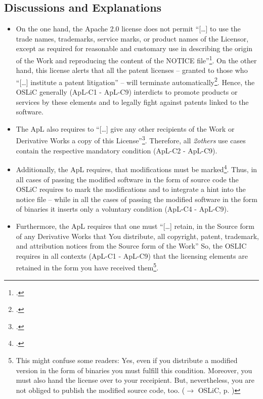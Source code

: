 \subsection{Discussions and Explanations}
\begin{itemize}
  \item On the one hand, the Apache 2.0 license does not permit
  \enquote{[\ldots] to use the trade names, trademarks, service marks, or
  product names of the Licensor, except as required for reasonable and customary
  use in describing the origin of the Work and reproducing the content of the
  NOTICE file}\footcite[cf.][\nopage wp.\ §6]{Apl20OsiLicense2004a}. On the other
  hand, this license alerts that all the patent licenses – granted to those who
  \enquote{[\ldots] institute a patent litigation} – will terminate
  automatically\footcite[cf.][\nopage wp.\ §3]{Apl20OsiLicense2004a}. Hence, the
  OSLiC generally (ApL-C1 - ApL-C9) interdicts to promote products or services by
  these elements and to legally fight against patents linked to the software.
  
  \item The ApL also requires to \enquote{[\ldots] give any other recipients of
  the Work or Derivative Works a copy of this License}\footcite[cf.][\nopage wp.\
  §4.1]{Apl20OsiLicense2004a}. Therefore, all \emph{2others} use cases contain
  the respective mandatory condition (ApL-C2 - ApL-C9).
   
  \item Additionally, the ApL requires, that modifications must be
  marked\footcite[cf.][\nopage wp.\ §4.2]{Apl20OsiLicense2004a}. Thus, in all
  cases of passing the modified software in the form of source code the OSLiC
  requires to mark the modifications and to integrate a hint into the notice
  file – while in all the cases of passing the modified software in the form of
  binaries it inserts only a voluntary condition (ApL-C4 - ApL-C9).
  
  \item Furthermore, the ApL requires that one must \enquote{[\ldots] retain, in
  the Source form of any Derivative Works that You distribute, all copyright,
  patent, trademark, and attribution notices from the Source form of the Work}
  So, the OSLIC requires in all contexts (ApL-C1 - ApL-C9) that the licensing
  elements are retained in the form you have received them\footnote{This might
  confuse some readers: Yes, even if you distribute a modified version in the
  form of binaries you must fulfill this condition. Moreover, you must also hand
  the license over to your receipient. But, nevertheless, you are not obliged to
  publish the modified source code, too. ($\rightarrow$ OSLiC, p.
  \pageref{sec:ProtectPowerOfApL})}.
  

\end{itemize}
